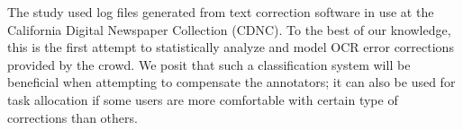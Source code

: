 \documentclass{acm_proc_article-sp}
\begin{document}
The study used log files generated from text correction software in use at the California Digital Newspaper Collection (CDNC). %
To the best of our knowledge, this is the first attempt to statistically analyze and model OCR error corrections provided by the crowd.
We posit that such a classification system will be beneficial when attempting to compensate the annotators; it can also be used for task allocation if some users are more comfortable with certain type of corrections than others.


%
\end{document}
